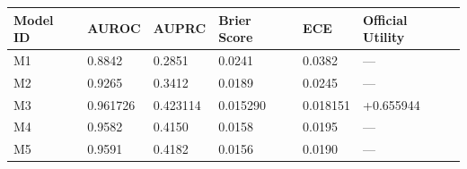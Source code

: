 \begin{tabular}{llllll}
\toprule
Model ID & AUROC & AUPRC & Brier Score & ECE & Official Utility \\
\midrule
M1 & 0.8842 & 0.2851 & 0.0241 & 0.0382 & — \\
M2 & 0.9265 & 0.3412 & 0.0189 & 0.0245 & — \\
M3 & 0.961726 & 0.423114 & 0.015290 & 0.018151 & +0.655944 \\
M4 & 0.9582 & 0.4150 & 0.0158 & 0.0195 & — \\
M5 & 0.9591 & 0.4182 & 0.0156 & 0.0190 & — \\
\bottomrule
\end{tabular}
